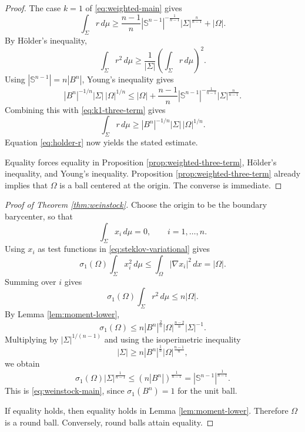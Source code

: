 \documentclass[11pt,reqno]{amsart}
\numberwithin{equation}{section}
\theoremstyle{definition}
\newcommand{\Sn}{\mathbb S}
\newcommand{\Om}{\Omega}
\newcommand{\Sig}{\Sigma}
\begin{document}
\begin{proof}
The case $k=1$ of \eqref{eq:weighted-main} gives
\begin{equation}\label{eq:k1-three-term}
    \int_\Sig r\,d\mu
    \geq
    \frac{n-1}{n}|\Sn^{n-1}|^{-\frac1{n-1}}|\Sig|^{\frac n{n-1}}
    +|\Om|.
\end{equation}
By H\"older's inequality,
\begin{equation}\label{eq:holder-r}
    \int_\Sig r^2\,d\mu
    \geq
    \frac1{|\Sig|}\left(\int_\Sig r\,d\mu\right)^2.
\end{equation}
Using $|\Sn^{n-1}|=n|B^n|$, Young's inequality gives
\begin{equation*}
    |B^n|^{-1/n}|\Sig|\,|\Om|^{1/n}
    \leq
    |\Om|+\frac{n-1}{n}|\Sn^{n-1}|^{-\frac1{n-1}}|\Sig|^{\frac n{n-1}}.
\end{equation*}
Combining this with \eqref{eq:k1-three-term} gives
\begin{equation*}
    \int_\Sig r\,d\mu
    \geq
    |B^n|^{-1/n}|\Sig|\,|\Om|^{1/n}.
\end{equation*}
Equation \eqref{eq:holder-r} now yields the stated estimate.

Equality forces equality in Proposition \ref{prop:weighted-three-term}, H\"older's inequality, and Young's inequality.  Proposition \ref{prop:weighted-three-term} already implies that $\Om$ is a ball centered at the origin.  The converse is immediate.
\end{proof}

\begin{proof}[Proof of Theorem \ref{thm:weinstock}]
Choose the origin to be the boundary barycenter, so that
\begin{equation*}
    \int_\Sig x_i\,d\mu=0,
    \qquad i=1,\ldots,n.
\end{equation*}
Using $x_i$ as test functions in \eqref{eq:steklov-variational} gives
\begin{equation*}
    \sigma_1(\Om)\int_\Sig x_i^2\,d\mu
    \leq
    \int_\Om|\nabla x_i|^2\,dx
    =|\Om|.
\end{equation*}
Summing over $i$ gives
\begin{equation*}
    \sigma_1(\Om)\int_\Sig r^2\,d\mu
    \leq n|\Om|.
\end{equation*}
By Lemma \ref{lem:moment-lower},
\begin{equation*}
    \sigma_1(\Om)
    \leq
    n|B^n|^{\frac2n}|\Om|^{\frac{n-2}{n}}|\Sig|^{-1}.
\end{equation*}
Multiplying by $|\Sig|^{1/(n-1)}$ and using the isoperimetric inequality
\begin{equation*}
    |\Sig|\geq n|B^n|^{\frac1n}|\Om|^{\frac{n-1}{n}},
\end{equation*}
we obtain
\begin{equation*}
    \sigma_1(\Om)|\Sig|^{\frac1{n-1}}
    \leq
    (n|B^n|)^{\frac1{n-1}}
    =|\Sn^{n-1}|^{\frac1{n-1}}.
\end{equation*}
This is \eqref{eq:weinstock-main}, since $\sigma_1(B^n)=1$ for the unit ball.

If equality holds, then equality holds in Lemma \ref{lem:moment-lower}.  Therefore $\Om$ is a round ball.  Conversely, round balls attain equality.
\end{proof}
\end{document}
